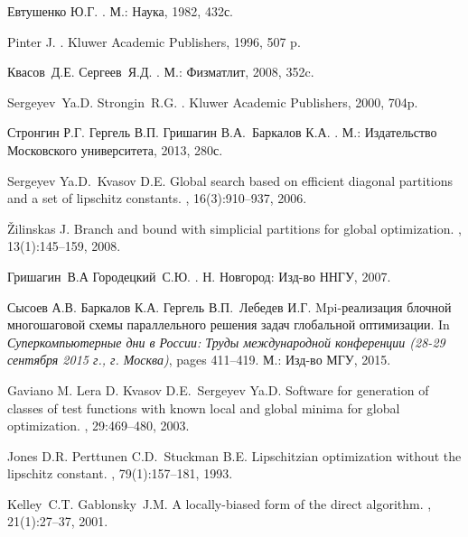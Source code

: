 \documentclass[a4paper]{article}
\begin{document}
\begin{thebibliography}{10}

Евтушенко Ю.Г.
.
\newblock М.: Наука, 1982, 432с.

Pinter J.
.
\newblock Kluwer Academic Publishers, 1996, 507 p.

Квасов~Д.Е. Сергеев~Я.Д.
.
\newblock М.: Физматлит, 2008, 352c.

Sergeyev~Ya.D. Strongin~R.G.
.
\newblock Kluwer Academic Publishers, 2000, 704p.

Стронгин Р.Г. Гергель В.П. Гришагин
  В.А.~Баркалов К.А.
.
\newblock М.: Издательство Московского
  университета, 2013, 280с.

Sergeyev Ya.D.~Kvasov D.E.
\newblock Global search based on efficient diagonal partitions and a set of
  lipschitz constants.
, 16(3):910–937, 2006.

Žilinskas J.
\newblock Branch and bound with simplicial partitions for global optimization.
, 13(1):145–159, 2008.

Гришагин~В.А Городецкий~С.Ю.
.
\newblock Н. Новгород: Изд-во ННГУ, 2007.

Сысоев А.В. Баркалов К.А. Гергель
  В.П.~Лебедев И.Г.
\newblock Mpi-реализация блочной многошаговой
  схемы параллельного решения задач
  глобальной оптимизации.
\newblock In {\em Суперкомпьютерные дни в России:
  Труды международной конференции (28-29
  сентября 2015 г., г. Москва)}, pages 411--419. М.:
  Изд-во МГУ, 2015.

Gaviano M. Lera D. Kvasov D.E.~Sergeyev Ya.D.
\newblock Software for generation of classes of test functions with known local
  and global minima for global optimization.
, 29:469--480, 2003.

Jones D.R. Perttunen C.D.~Stuckman B.E.
\newblock Lipschitzian optimization without the lipschitz constant.
,
  79(1):157–181, 1993.

Kelley~C.T. Gablonsky~J.M.
\newblock A locally-biased form of the direct algorithm.
, 21(1):27--37, 2001.

\end{thebibliography}
\end{document}
